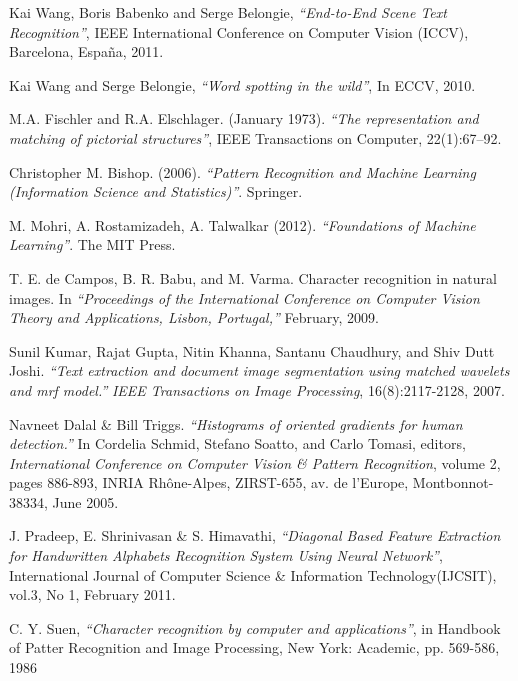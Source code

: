 \newpage	
{}		%

\begin{thebibliography}{100}

 	 	Kai Wang, Boris Babenko and Serge Belongie,
	 	\emph{``End-to-End Scene Text Recognition''},
		IEEE International Conference on Computer Vision (ICCV), 
		Barcelona, España,
		2011.
		
 	 	Kai Wang and Serge Belongie,
	 	\emph{``Word spotting in the wild''},
		In ECCV, 2010.
		
 	 	M.A. Fischler and R.A. Elschlager. (January 1973).
	 	\emph{``The representation and matching of pictorial
structures''},
		IEEE Transactions on Computer, 
		22(1):67–92.
		
		Christopher M. Bishop. (2006).
		\emph{``Pattern Recognition and Machine Learning (Information Science and Statistics)''}.
		Springer.
		
	 	M. Mohri, A. Rostamizadeh, A. Talwalkar (2012).
	 	\emph{``Foundations of Machine Learning''}.
	 	The MIT Press.
		
		T. E. de Campos, B. R. Babu, and M. Varma.
		Character recognition in natural images.
		In \emph{``Proceedings of the International Conference on Computer Vision Theory and Applications, Lisbon, Portugal,''}
		February, 2009.
		
		Sunil Kumar, Rajat Gupta, Nitin Khanna, Santanu Chaudhury, and Shiv Dutt Joshi.
		\emph{``Text extraction and document image segmentation using matched wavelets and mrf model.''}
		\textit{IEEE Transactions on Image Processing}, 16(8):2117-2128, 2007.
	
		Navneet Dalal \& Bill Triggs.
		\emph{``Histograms of oriented gradients for human detection.''}
		In Cordelia Schmid, Stefano Soatto, and Carlo Tomasi, editors, \textit{International Conference on Computer Vision \& Pattern Recognition}, volume 2, pages 886-893, INRIA Rh\^{o}ne-Alpes, ZIRST-655, av. de l'Europe, Montbonnot-38334, June 2005.
		
		J. Pradeep, E. Shrinivasan \& S. Himavathi,
		\emph{``Diagonal Based Feature Extraction for Handwritten Alphabets Recognition System Using Neural Network''},
		International Journal of Computer Science \& Information Technology(IJCSIT),
		vol.3, No 1, February 2011.
		
		C. Y. Suen,
		\emph{``Character recognition by computer and applications''},
		in Handbook of Patter Recognition and Image Processing,
		New York: Academic,
		pp. 569-586,
		1986


\end{thebibliography}
